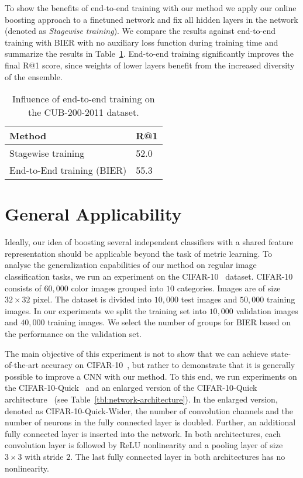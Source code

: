 \documentclass[10pt,journal,compsoc]{IEEEtran}
\begin{document}
To show the benefits of end-to-end training with our method we apply our online
boosting approach to a finetuned network and fix all hidden layers in the
network (denoted as \emph{Stagewise training}). We compare the results against end-to-end training with \ac{BIER} with no auxiliary loss function during training time and summarize the
results in Table~\ref{tbl:boosting-end-to-end}. End-to-end training significantly improves the final R@1 score, since 
weights of lower layers benefit from the increased diversity of the ensemble.

\begin{table}[htbp]
    \caption{Influence of end-to-end training on the CUB-200-2011 dataset.}
    \label{tbl:boosting-end-to-end}
    \renewcommand{\arraystretch}{1.3}
    \centering
    \begin{tabular}{ll}
    \hline
    Method & R@1 \\
    \hline
    Stagewise training & 52.0 \\
    End-to-End training (\ac{BIER}) & 55.3  \\
    \hline
    \end{tabular}
\end{table}\section{General Applicability}\label{sec:general-applicability}

Ideally, our idea of boosting several independent classifiers with a shared
feature representation should be applicable beyond the task of metric learning.
To analyse the generalization capabilities of our method on regular image
classification tasks, we run an experiment on the CIFAR-10~\cite{krizhevsky2009learning} dataset.
CIFAR-10 consists of $60,000$ color images grouped into $10$ categories. Images are of size $32\times32$ pixel.
The dataset is divided into $10,000$ test images and $50,000$ training images. In our experiments we split
the training set into $10,000$ validation images and $40,000$ training images. We select the number of groups for \ac{BIER} based on the performance on the validation set.

The main
objective of this experiment is not to show that we can achieve
state-of-the-art accuracy on CIFAR-10~\cite{krizhevsky2009learning}, but rather to demonstrate that it 
is generally possible to
improve a \ac{CNN} with our method. 
To this end, we run experiments on the CIFAR-10-Quick~\cite{jia2014caffe} and an enlarged version of the CIFAR-10-Quick architecture~\cite{cogswell2016reducing} (see Table~\ref{tbl:network-architecture}). 
In the enlarged version, denoted as CIFAR-10-Quick-Wider, the number of convolution channels 
and the number of neurons in the fully connected layer is doubled. Further, an additional fully connected layer is inserted into the network. 
In both architectures, each convolution layer is
followed by \ac{ReLU} nonlinearity and a pooling layer of size $3\times3$ with
stride $2$. The last fully connected layer in both architectures has no nonlinearity. 
\end{document}
